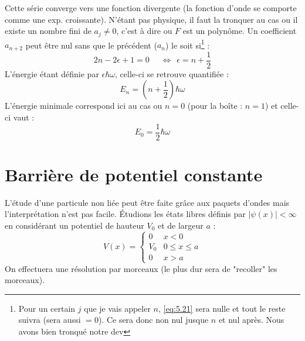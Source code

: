 \documentclass[british,french,11pt, a4paper, openany]{book}
\begin{document}
	Cette série converge vers une fonction divergente (la fonction d'onde se comporte comme une exp. croissante). N'étant pas physique, il faut la tronquer au cas ou il existe un nombre fini de $a_j \neq 0$, c'est à dire ou $F$ est un polynôme. Un coefficient $a_{n+2}$ peut être nul sans que le précédent ($a_n$) le soit si\footnote{Pour un certain $j$ que je vais appeler $n$, \eqref{eq:5.21} sera nulle et tout le reste suivra (sera aussi $=0$). Ce sera donc non nul jusque $n$ et nul après. Nous avons bien tronqué notre dev} :
	\begin{equation}
		2n-2\epsilon +1 = 0\  \ \ \ \ \ \Leftrightarrow\ \ \epsilon = n+\frac{1}{2}
	\end{equation}
	L'énergie étant définie par $\epsilon\hbar\omega$, celle-ci se retrouve quantifiée :
	\begin{equation}
		E_n = (n+\frac{1}{2})\hbar\omega
	\end{equation}
	L'énergie minimale correspond ici au cas ou $n=0$ (pour la boîte : $n=1$) et celle-ci vaut :
	\begin{equation}
		E_0 = \frac{1}{2}\hbar\omega
	\end{equation}
	
	
	\section{Barrière de potentiel constante}
	L'étude d'une particule non liée peut être faite grâce aux paquets d'ondes mais l'interprétation n'est pas facile. Étudions les états libres définis par $|\psi(x)|<\infty$ en considérant un potentiel de hauteur $V_0$ et de largeur $a$ :
	\begin{equation}
		V(x) = \left\{\begin{array}{ll}
			0 & x < 0\\
			V_0 & 0\leq x \leq a\\
			0 & x>a
		\end{array}\right.
	\end{equation}
	On effectuera une résolution par morceaux (le plus dur sera de "recoller" les morceaux).\\
	
\end{document}
